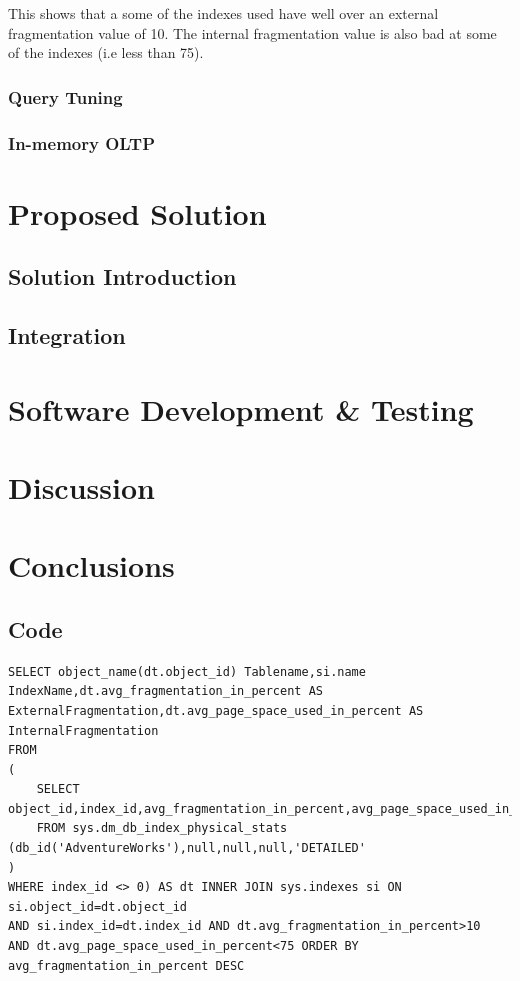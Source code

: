 \documentclass{cslthse-msc}
\begin{document}
This shows that a some of the indexes used have well over an external fragmentation value of 10. The internal fragmentation value is also bad at some of the indexes (i.e less than 75).
\subsection{Query Tuning}

\subsection{In-memory OLTP}

\chapter{Proposed Solution}\label{sec:proposedsoluton}

\section{Solution Introduction}

\section{Integration}

\chapter{Software Development \& Testing}

\chapter{Discussion}

\chapter{Conclusions}




\begin{appendices}

\chapter{Code}
\begin{lstlisting}[caption={Algorithm to find fragmented tables and the fragmentation values.},label=See DB-Fragmentation]
SELECT object_name(dt.object_id) Tablename,si.name
IndexName,dt.avg_fragmentation_in_percent AS
ExternalFragmentation,dt.avg_page_space_used_in_percent AS
InternalFragmentation
FROM
(
    SELECT object_id,index_id,avg_fragmentation_in_percent,avg_page_space_used_in_percent
    FROM sys.dm_db_index_physical_stats (db_id('AdventureWorks'),null,null,null,'DETAILED'
)
WHERE index_id <> 0) AS dt INNER JOIN sys.indexes si ON si.object_id=dt.object_id
AND si.index_id=dt.index_id AND dt.avg_fragmentation_in_percent>10
AND dt.avg_page_space_used_in_percent<75 ORDER BY avg_fragmentation_in_percent DESC
\end{lstlisting}
\label{lst:fragalg}
\end{appendices}
\end{document}
